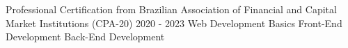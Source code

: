 \begin{cvhonors}
  \cvhonor
    {Professional Certification from Brazilian Association of Financial and Capital Market Institutions}
    {(CPA-20)}
    {2020 - 2023}
    {}
  \cvhonor
    {Web Development Basics}
    {}
    {}
    {}
  \cvhonor
    {Front-End Development}
    {}
    {}
    {}
  \cvhonor
    {Back-End Development}
    {}
    {}
    {}
\end{cvhonors}

\vspace{.5cm}